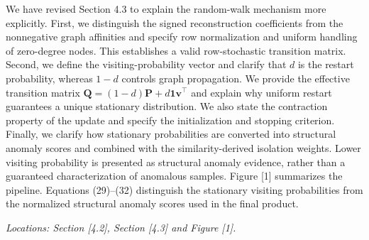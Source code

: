 \documentclass{ar2rc}
\begin{document}
{We have revised Section 4.3 to explain the random-walk mechanism more explicitly. First, we distinguish the signed reconstruction coefficients from the nonnegative graph affinities and specify row normalization and uniform handling of zero-degree nodes. This establishes a valid row-stochastic transition matrix. Second, we define the visiting-probability vector and clarify that \(d\) is the restart probability, whereas \(1-d\) controls graph propagation. We provide the effective transition matrix $\boldsymbol{Q}=(1-d)\boldsymbol{P}+d\boldsymbol{1}\boldsymbol{v}^\top$ and explain why uniform restart guarantees a unique stationary distribution. We also state the contraction property of the update and specify the initialization and stopping criterion. Finally, we clarify how stationary probabilities are converted into structural anomaly scores and combined with the similarity-derived isolation weights. Lower visiting probability is presented as structural anomaly evidence, rather than a guaranteed characterization of anomalous samples. Figure [1] summarizes the pipeline. Equations (29)–(32) distinguish the stationary visiting probabilities from the normalized structural anomaly scores used in the final product.

\textit{Locations: Section [4.2], Section [4.3] and Figure [1].}
}
\end{document}
